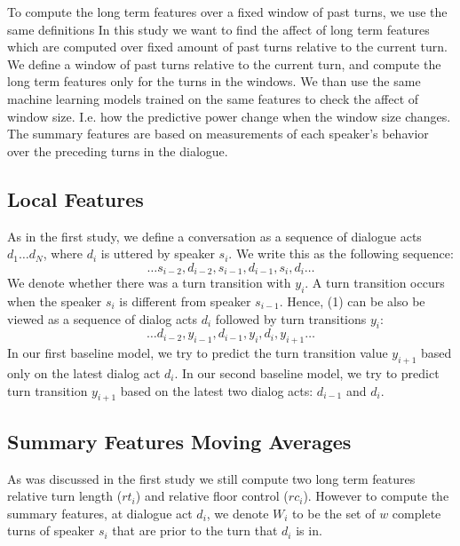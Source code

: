 To compute the long term features over a fixed window of past turns, we use the same definitions 
In this study we want to find the affect of long term features which are computed over fixed amount of past 
turns relative to the current turn. We define a window of past turns relative to the current turn, and compute the long term features only for the turns in the windows. We than use the same machine learning models trained on the same features to check the affect of window size. I.e. how the predictive power change when the window size changes.   The summary features are based on measurements of each speaker's behavior over the preceding turns in the dialogue.

     \subsection{Local Features}

     As in the first study, we define a conversation as a sequence of dialogue acts $d_1 \dots d_N$, where $d_i$ is uttered by speaker $s_i$.  We write this as the following sequence:
%
     \begin{equation}
       \ldots  s_{i-2}, d_{i-2}, s_{i-1} , d_{i-1}, s_i, d_i  \ldots
     \end{equation}
     We denote whether there was a turn transition with $y_i$. A turn transition occurs when the speaker $s_i$ is different from speaker $s_{i-1}$. Hence, (1) can be also be viewed as a sequence of dialog acts $d_i$ followed by turn transitions $y_i$:
%
     \begin{equation}
       \ldots    d_{i-2}, y_{i-1}, d_{i-1}, y_{i} , d_i, y_{i+1} \ldots
     \end{equation}
      In our first baseline model, we try to predict the turn transition value $y_{i+1}$ based only on the latest dialog act $d_i$. In our second baseline model, we try to predict turn transition $y_{i+1}$ based on the latest two dialog acts: $d_{i-1}$ and $d_i$.

       

     \subsection{Summary Features Moving Averages}

     As was discussed in the first study we still compute two long term features relative turn length ($rt_i$) and relative floor control ($rc_i$). However to compute the summary features, at dialogue act $d_i$, we denote  $W_i$ to be the set of $w$ complete turns of speaker $s_i$ that are prior to the turn that $d_i$ is in. 
     
